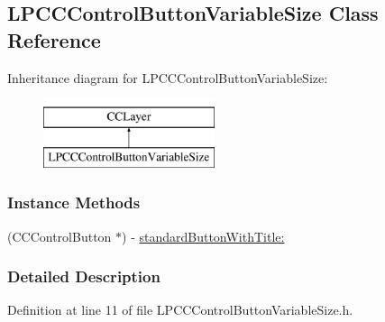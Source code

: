 \hypertarget{interface_l_p_c_c_control_button_variable_size}{\subsection{L\-P\-C\-C\-Control\-Button\-Variable\-Size Class Reference}
\label{d7/d50/interface_l_p_c_c_control_button_variable_size}
}
Inheritance diagram for L\-P\-C\-C\-Control\-Button\-Variable\-Size\-:\begin{figure}[H]
\begin{center}
\leavevmode
\includegraphics[height=2.000000cm]{d7/d50/interface_l_p_c_c_control_button_variable_size}
\end{center}
\end{figure}
\subsubsection*{Instance Methods}
\begin{DoxyCompactItemize}
\item 
(C\-C\-Control\-Button $\ast$) -\/ \hyperlink{interface_l_p_c_c_control_button_variable_size_acd2df17edaf3d7dbd80e283a7ee35c52}{standard\-Button\-With\-Title\-:}
\end{DoxyCompactItemize}


\subsubsection{Detailed Description}


Definition at line 11 of file L\-P\-C\-C\-Control\-Button\-Variable\-Size.\-h.



